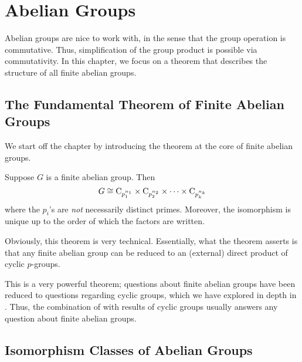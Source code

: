 \chapter{Abelian Groups}
Abelian groups are nice to work with, in the sense that the group operation is commutative. Thus, simplification of the group product is possible via commutativity. In this chapter, we focus on a theorem that describes the structure of all finite abelian groups.

\section{The Fundamental Theorem of Finite Abelian Groups}
We start off the chapter by introducing the theorem at the core of finite abelian groups.

\begin{theorem}\label{thrm-fundamental-theorem-finite-abelian-groups}
    Suppose $G$ is a finite abelian group. Then
    \[
        G \cong \mathrm{C}_{p_1^{n_1}} \times \mathrm{C}_{p_2^{n_2}} \times \cdots \times \mathrm{C}_{p_k^{n_k}}
    \]
    where the $p_i$'s are \textit{not} necessarily distinct primes. Moreover, the isomorphism is unique up to the order of which the factors are written.
\end{theorem}

Obviously, this theorem is very technical. Essentially, what the theorem asserts is that any finite abelian group can be reduced to an (external) direct product of cyclic $p$-groups.

This is a very powerful theorem; questions about finite abelian groups have been reduced to questions regarding cyclic groups, which we have explored in depth in . Thus, the combination of  with results of cyclic groups usually answers any question about finite abelian groups.

\section{Isomorphism Classes of Abelian Groups}
